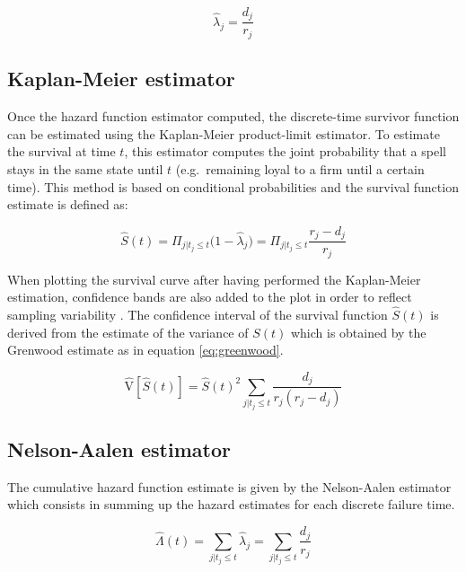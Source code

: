 \documentclass[
]{book}
\begin{document}
\begin{equation}
  \hat{\lambda}_j = \frac{d_j}{r_j}
  \label{eq:hazest}
\end{equation}

\hypertarget{kaplan-meier-estimator}{%
\subsection{Kaplan-Meier estimator}\label{kaplan-meier-estimator}}

Once the hazard function estimator computed, the discrete-time survivor function can be estimated using the Kaplan-Meier product-limit estimator. To estimate the survival at time \(t\), this estimator computes the joint probability that a spell stays in the same state until \(t\) (e.g.~remaining loyal to a firm until a certain time). This method is based on conditional probabilities and the survival function estimate is defined as:

\begin{equation}
  \hat{S}(t) = \Pi_{j|t_j \leq t} \big(1-\hat{\lambda}_j\big) = \Pi_{j|t_j \leq t}\frac{r_j - d_j}{r_j}
  \label{eq:kaplanmeier}
\end{equation}

When plotting the survival curve after having performed the Kaplan-Meier estimation, confidence bands are also added to the plot in order to reflect sampling variability \citep{CAMERON_TRIVEDI}. The confidence interval of the survival function \(\hat{S}(t)\) is derived from the estimate of the variance of \(S(t)\) which is obtained by the Grenwood estimate as in equation \eqref{eq:greenwood}.

\begin{equation}
  \widehat{\mathrm{V}}[\hat{S}(t)] = \hat{S}(t)^2 \sum_{j|t_j \leq t} \frac{d_j}{r_j(r_j-d_j)}
  \label{eq:greenwood}
\end{equation}

\hypertarget{nelson-aalen-estimator}{%
\subsection{Nelson-Aalen estimator}\label{nelson-aalen-estimator}}

The cumulative hazard function estimate is given by the Nelson-Aalen estimator which consists in summing up the hazard estimates for each discrete failure time.

\begin{equation}
  \hat{\Lambda}(t) = \sum_{j | t_j \leq t} \hat{\lambda}_{j} = \sum_{j | t_j \leq t} \frac{d_j}{r_j}
  \label{eq:nelsonaalen}
\end{equation}
\end{document}
